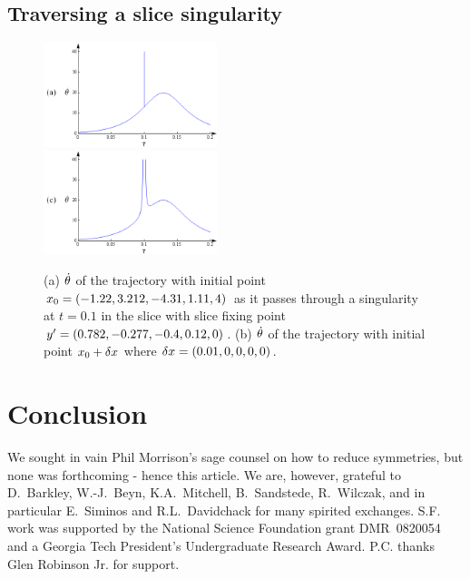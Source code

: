 \documentclass[%
 reprint,%
 amssymb, amsmath,%
 aip,cha,%
 graphicx
]{revtex4-1}
\begin{document}
\subsection{Traversing a slice singularity}
\label{sect:passingSing}

 \begin{figure}
\includegraphics[width=0.45\textwidth]{CLEsingpass}
\\
\includegraphics[width=0.45\textwidth]{CLEnearsing2}%
 \caption{\label{fig:dthetasing}
 (a) $\dot{{\bf \theta}}$ of the trajectory with initial point
$x_0=(-1.22, 3.212, -4.31, 1.11, 4)$ as it passes through a
singularity at $t=0.1$ in the slice with slice fixing point
${y'}=(0.782,-0.277,-0.4,0.12,0)$.
(b) $\dot{{\bf \theta}}$ of the trajectory with initial point $x_0+\delta
x$ where $\delta x=(0.01,0,0,0,0)$.
 }%
 \end{figure}

\section{Conclusion}
\label{sec:intro}


\begin{acknowledgments}
We sought in vain Phil Morrison's sage counsel on how
to reduce symmetries, but none was forthcoming - hence this article.
We are, however, grateful to
D.~Barkley,
W.-J.~Beyn,
K.A.~Mitchell,
B.~Sandstede,
R.~Wilczak,
and in particular E.~Siminos and R.L.~Davidchack
for many spirited exchanges.
S.F. work was supported by the National Science Foundation
grant DMR~0820054 and a Georgia Tech President's Undergraduate
Research Award.
P.C. thanks Glen Robinson Jr. for support. 	
\end{acknowledgments}



\PublicPrivate{}{

	} %
\end{document}
